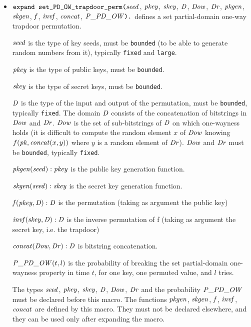 \documentclass{article}
\begin{document}
\begin{itemize}
\item $\texttt{expand set\_PD\_OW\_trapdoor\_perm(}\mathit{seed}$, $\mathit{pkey}$, $\mathit{skey}$, $\mathit{D}$, $\mathit{Dow}$, $\mathit{Dr}$, $\mathit{pkgen}$, $\mathit{skgen}$, $\mathit{f}$, $\mathit{invf}$, $\mathit{concat}$, $\mathit{P\_PD\_OW}\texttt{).}$ defines a set partial-domain one-way trapdoor permutation.

   $\mathit{seed}$ is the type of key seeds, must be \texttt{bounded} (to be able to generate random numbers from it), typically \texttt{fixed} and \texttt{large}.

   $\mathit{pkey}$ is the type of public keys, must be \texttt{bounded}.

   $\mathit{skey}$ is the type of secret keys, must be \texttt{bounded}.

   $\mathit{D}$ is the type of the input and output of the permutation, must be \texttt{bounded}, typically \texttt{fixed}.
   The domain $\mathit{D}$ consists of the concatenation of bitstrings in $\mathit{Dow}$ and $\mathit{Dr}$.
   $\mathit{Dow}$ is the set of sub-bitstrings of $\mathit{D}$ on which one-wayness holds (it is difficult to compute the
   random element $x$ of $\mathit{Dow}$ knowing $f(\mathit{pk}, \mathit{concat}(x,y))$ where $y$ is a random element of $\mathit{Dr}$).
   $\mathit{Dow}$ and $\mathit{Dr}$ must be \texttt{bounded}, typically \texttt{fixed}.
  
   $\mathit{pkgen}(\mathit{seed}): \mathit{pkey}$ is the public key generation function.

   $\mathit{skgen}(\mathit{seed}): \mathit{skey}$ is the secret key generation function.

   $\mathit{f}(\mathit{pkey}, \mathit{D}):\mathit{D}$ is the permutation (taking as argument the public key)

   $\mathit{invf}(\mathit{skey}, \mathit{D}):\mathit{D}$ is the inverse permutation of f (taking as argument the secret key,
         i.e. the trapdoor)

   $\mathit{concat}(\mathit{Dow}, \mathit{Dr}):\mathit{D}$ is bitstring concatenation.

   $\mathit{P\_PD\_OW}(t,l)$ is the probability of breaking the set partial-domain one-wayness property
   in time $t$, for one key, one permuted value, and $l$ tries.

   The types $\mathit{seed}$, $\mathit{pkey}$, $\mathit{skey}$, $\mathit{D}$, $\mathit{Dow}$, $\mathit{Dr}$ 
   and the probability $\mathit{P\_PD\_OW}$ must be
   declared before this macro. The functions $\mathit{pkgen}$, $\mathit{skgen}$, $\mathit{f}$, $\mathit{invf}$, $\mathit{concat}$
   are defined by this macro. They must not be declared elsewhere, and
   they can be used only after expanding the macro. 


\end{itemize}
\end{document}
